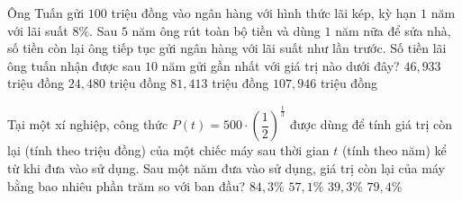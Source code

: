 \begin{ex}%
	Ông Tuấn gửi $100$ triệu đồng vào ngân hàng với hình thức lãi kép, kỳ hạn $1$ năm với lãi suất $8\%$. Sau $5$ năm ông rút toàn bộ tiền và dùng $1$ năm nữa để sửa nhà, số tiền còn lại ông tiếp tục gửi ngân hàng với lãi suất như lần trước. Số tiền lãi ông tuấn nhận được sau  $10$ năm gửi gần nhất với giá trị nào dưới đây?
	\choice 
		{$46{,}933$  triệu đồng}
		{$24{,}480$  triệu đồng}
		{\True  $81{,}413$ triệu đồng}
		 {$107{,}946$ triệu đồng}
\end{ex}

\begin{ex}%
	Tại một xí nghiệp, công thức $P(t)=500\cdot \left(\dfrac{1}{2}\right)^{\frac{t}{3}}$ được dùng để tính giá trị còn lại (tính theo triệu đồng) của một chiếc máy sau thời gian $t$ (tính theo năm) kể từ khi đưa vào sử dụng. Sau một năm đưa vào sử dụng, giá trị còn lại của  máy bằng bao nhiêu phần trăm so với ban đầu?
	\choice 
		{$84,3\%$} 
		{$57,1\%$} 
		 {$39,3\%$}
		{\True  $79,4\%$}
\end{ex}

